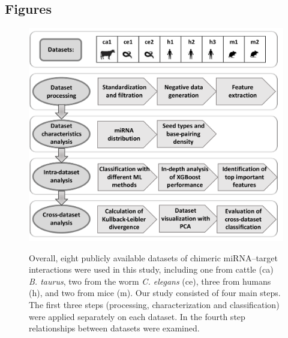 \documentclass{bmcart}
\begin{document}
\begin{backmatter}
\section*{Figures}
\begin{figure}[h!]
  \caption{}
  \includegraphics[width=\textwidth]{flowchart2.pdf}
  \label{fig:flowchart}
  \caption*{Overall, eight publicly available datasets of chimeric miRNA--target interactions were used in this study, including one from cattle (ca) \textit{B. taurus}, two from the worm \textit{C. elegans} (ce), three from humans (h), and two from mice (m). Our study consisted of four main steps. The first three steps (processing, characterization and classification) were applied separately on each dataset. In the fourth step  relationships between datasets were examined. 
  }
  \end{figure}






\end{backmatter}
\end{document}
